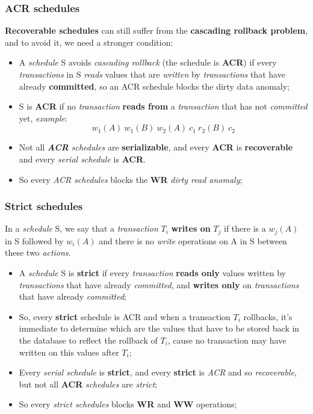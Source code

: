 \documentclass{article}
\begin{document}
\subsubsection{ACR schedules}
\textbf{Recoverable schedules} can still suffer from the \textbf{cascading rollback problem}, and to avoid it, we need a stronger condition:
\begin{itemize}
\item A \emph{schedule} S avoids \emph{cascading rollback} (the schedule is \textbf{ACR}) if every \emph{transactions} in S \emph{reads} values that are \emph{written} by \emph{transactions} that have already \textbf{committed}, so an ACR schedule blocks the dirty data anomaly;
\item S is \textbf{ACR} if no \emph{transaction} \textbf{reads from} a \emph{transaction} that has not \emph{committed} yet, \emph{example}:
\[w_1(A)\ w_1(B)\ w_2(A)\ c_1\ r_2(B)\ c_2\]
\item Not all \emph{\textbf{ACR} schedules} are \textbf{serializable}, and every \textbf{ACR} is \textbf{recoverable} and every \emph{serial schedule} is \textbf{ACR}.
\item So every \emph{ACR schedules} blocks the \textbf{WR} \emph{dirty read anomaly};
\end{itemize}
\subsubsection{Strict schedules}
In a \emph{schedule} S, we say that a \emph{transaction} $T_i$ \textbf{writes on} $T_j$ if there is a $w_j(A)$ in S followed by $w_i(A)$ and there is no \emph{write} operations on A in S between these two \emph{actions}.
\begin{itemize}
\item A \emph{schedule} S is \textbf{strict} if every \emph{transaction} \textbf{reads only} values written by \emph{transactions} that have already \emph{committed}, and \textbf{writes only} on \emph{transactions} that have already \emph{committed};
\item So, every \textbf{strict} schedule is ACR and when a transaction $T_i$ rollbacks, it's immediate to determine which are the values that have to be stored back in the database to reflect the rollback of $T_i$, cause no transaction may have written on this values after $T_i$;
\item Every \emph{serial schedule} is \textbf{strict}, and every \textbf{strict} is \emph{ACR} and so \emph{recoverable}, but not all \textbf{ACR} \emph{schedules} are \emph{strict};
\item So every \emph{strict schedules} blocks \textbf{WR} and \textbf{WW} operations;
\end{itemize}
\end{document}
